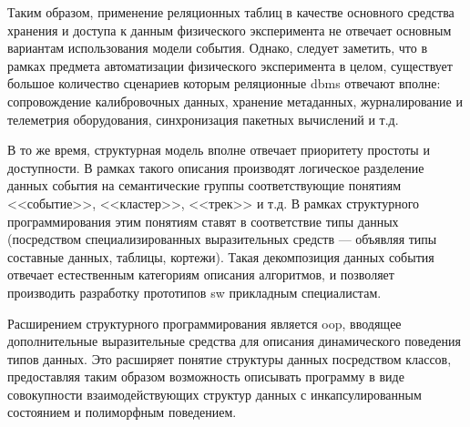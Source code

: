 Таким образом, применение реляционных таблиц в качестве основного средства
хранения и доступа к данным физического эксперимента не отвечает
основным вариантам использования модели события. Однако, следует
заметить, что в рамках предмета автоматизации физического эксперимента в
целом, существует большое количество сценариев которым
реляционные \acrshort{dbms} отвечают вполне: сопровождение калибровочных данных,
хранение метаданных, журналирование и телеметрия оборудования,
синхронизация пакетных вычислений и т.д.

В то же время, структурная модель вполне отвечает приоритету
простоты и доступности. В рамках такого
описания производят логическое разделение данных события на
семантические группы соответствующие понятиям <<событие>>,
<<кластер>>, <<трек>> и т.д. В рамках структурного
программирования этим понятиям ставят в соответствие
типы данных (посредством специализированных выразительных
средств --- объявляя типы составные данных, таблицы, кортежи).
Такая декомпозиция данных события
отвечает естественным категориям описания алгоритмов, и позволяет
производить разработку прототипов \acrshort{sw} прикладным специалистам.

Расширением структурного программирования является \acrshort{oop}, вводящее
дополнительные выразительные средства для описания динамического
поведения типов данных. Это расширяет понятие структуры данных
посредством классов, предоставляя таким образом
возможность описывать программу в виде совокупности взаимодействующих
структур данных с инкапсулированным состоянием и полиморфным
поведением.

%

